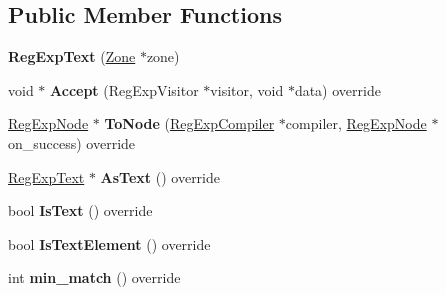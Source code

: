 \subsection*{Public Member Functions}
\begin{DoxyCompactItemize}
\item 
{\bfseries Reg\+Exp\+Text} (\hyperlink{classv8_1_1internal_1_1_zone}{Zone} $\ast$zone)\hypertarget{classv8_1_1internal_1_1_reg_exp_text_a0324310cc71e60bd7b4809c422d23d32}{}\label{classv8_1_1internal_1_1_reg_exp_text_a0324310cc71e60bd7b4809c422d23d32}

\item 
void $\ast$ {\bfseries Accept} (Reg\+Exp\+Visitor $\ast$visitor, void $\ast$data) override\hypertarget{classv8_1_1internal_1_1_reg_exp_text_aea179b143ae81674b36bb232fc7faefa}{}\label{classv8_1_1internal_1_1_reg_exp_text_aea179b143ae81674b36bb232fc7faefa}

\item 
\hyperlink{classv8_1_1internal_1_1_reg_exp_node}{Reg\+Exp\+Node} $\ast$ {\bfseries To\+Node} (\hyperlink{classv8_1_1internal_1_1_reg_exp_compiler}{Reg\+Exp\+Compiler} $\ast$compiler, \hyperlink{classv8_1_1internal_1_1_reg_exp_node}{Reg\+Exp\+Node} $\ast$on\+\_\+success) override\hypertarget{classv8_1_1internal_1_1_reg_exp_text_a6ea6b99a77e2b5fd64a5d29837be5ff7}{}\label{classv8_1_1internal_1_1_reg_exp_text_a6ea6b99a77e2b5fd64a5d29837be5ff7}

\item 
\hyperlink{classv8_1_1internal_1_1_reg_exp_text}{Reg\+Exp\+Text} $\ast$ {\bfseries As\+Text} () override\hypertarget{classv8_1_1internal_1_1_reg_exp_text_a92671346bcc28980f0f6fce28a1f1bbe}{}\label{classv8_1_1internal_1_1_reg_exp_text_a92671346bcc28980f0f6fce28a1f1bbe}

\item 
bool {\bfseries Is\+Text} () override\hypertarget{classv8_1_1internal_1_1_reg_exp_text_acba0fe87d94d0d3d2273c1c756b3b4fb}{}\label{classv8_1_1internal_1_1_reg_exp_text_acba0fe87d94d0d3d2273c1c756b3b4fb}

\item 
bool {\bfseries Is\+Text\+Element} () override\hypertarget{classv8_1_1internal_1_1_reg_exp_text_a9656a07fc9368d7d4b2cec3959fde1c9}{}\label{classv8_1_1internal_1_1_reg_exp_text_a9656a07fc9368d7d4b2cec3959fde1c9}

\item 
int {\bfseries min\+\_\+match} () override\hypertarget{classv8_1_1internal_1_1_reg_exp_text_aa314a4eba4ea4c94205347204cc2d102}{}\label{classv8_1_1internal_1_1_reg_exp_text_aa314a4eba4ea4c94205347204cc2d102}


\end{DoxyCompactItemize}
